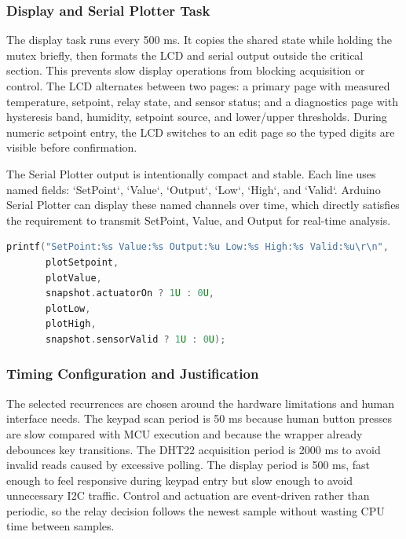 \subsubsection{Display and Serial Plotter Task}

The display task runs every 500 ms. It copies the shared state while holding the mutex briefly, then formats the LCD and serial output outside the critical section. This prevents slow display operations from blocking acquisition or control. The LCD alternates between two pages: a primary page with measured temperature, setpoint, relay state, and sensor status; and a diagnostics page with hysteresis band, humidity, setpoint source, and lower/upper thresholds. During numeric setpoint entry, the LCD switches to an edit page so the typed digits are visible before confirmation.

The Serial Plotter output is intentionally compact and stable. Each line uses named fields: `SetPoint`, `Value`, `Output`, `Low`, `High`, and `Valid`. Arduino Serial Plotter can display these named channels over time, which directly satisfies the requirement to transmit SetPoint, Value, and Output for real-time analysis.

\begin{lstlisting}[language=C++, caption=Serial Plotter report format, label=lst:plotter_output]
printf("SetPoint:%s Value:%s Output:%u Low:%s High:%s Valid:%u\r\n",
       plotSetpoint,
       plotValue,
       snapshot.actuatorOn ? 1U : 0U,
       plotLow,
       plotHigh,
       snapshot.sensorValid ? 1U : 0U);
\end{lstlisting}

\subsubsection{Timing Configuration and Justification}

The selected recurrences are chosen around the hardware limitations and human interface needs. The keypad scan period is 50 ms because human button presses are slow compared with MCU execution and because the wrapper already debounces key transitions. The DHT22 acquisition period is 2000 ms to avoid invalid reads caused by excessive polling. The display period is 500 ms, fast enough to feel responsive during keypad entry but slow enough to avoid unnecessary I2C traffic. Control and actuation are event-driven rather than periodic, so the relay decision follows the newest sample without wasting CPU time between samples.

